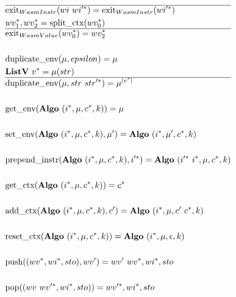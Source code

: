 \begin{align*}
  \hline
  &\exit_{WasmInstr}(wi ~ \seq{wi'}) = \exit_{WasmInstr}(\seq{wi'}) \\
%
  &\seq{wv_1}, \seq{wv_2} = \splitctx(\seq{wv_0}) \\
  \hline
  &\exit_{WasmValue}(\seq{wv_0}) = \seq{wv_2} \\
%
\newline \\
  &\duplicateenv(\mu, epsilon) = \mu \\
  &\listv ~ \seq v = \mu(str) \\
  \hline
  &\duplicateenv(\mu, str ~ \seq{str'}) = \mu^{|\seq v|} \\
%
\newline \\
  &\getenv(\algo ~ (\seq i, \mu, \seq c, k)) = \mu \\
%
\newline \\
  &\setenv(\algo ~ (\seq i, \mu, \seq c, k), \mu') = \algo ~ (\seq i, \mu', \seq c, k) \\
%
\newline \\
  &\prependinstr(\algo ~ (\seq i, \mu, \seq c, k), \seq{i'}) = \algo ~ (\seq{i'} ~ \seq i, \mu, \seq c, k) \\
%
\newline \\
  &\getctx(\algo ~ (\seq i, \mu, \seq c, k)) = \seq c \\
%
\newline \\
  &\addctx(\algo ~ (\seq i, \mu, \seq c, k), c') = \algo ~ (\seq i, \mu, c' ~ \seq c, k) \\
%
\newline \\
  &\resetctx(\algo ~ (\seq i, \mu, \seq c, k)) = \algo ~ (\seq i, \mu, \epsilon, k) \\
%
\newline \\
  &\push((\seq{wv}, \seq{wi}, sto), wv') = wv' ~ \seq{wv}, \seq{wi}, sto \\
%
\newline \\
  &\pop((wv ~ \seq{wv'}, \seq{wi}, sto)) = \seq{wv'}, \seq{wi}, sto \\
%
\newline \\

\end{align*}
